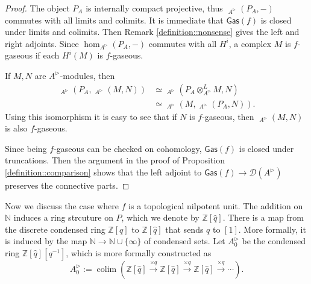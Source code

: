 \documentclass{article}
\theoremstyle{plain}
\theoremstyle{definition}
\theoremstyle{remark}
\DeclareMathOperator{\colim}{colim}
\DeclareMathOperator{\rhoms}{\underline{RHom}}
\newcommand{\dten}{\otimes ^{L}}
\newcommand{\huflag}{\triangleright}
\newcommand{\D}{\mathcal{D}}
\begin{document}
\begin{proof}
The object $ P _{A} $ is internally compact projective, thus $ \rhoms _{A ^{\huflag}}(P _{A}, -) $ commutes with all limits and colimits.
It is immediate that $ \mathsf{Gas}(f) $ is closed under limits and colimits.
Then Remark \ref{definition::nonsense} gives the left and right adjoints.
Since $ \hom _{A ^{\huflag}}(P _{A}, -) $ commutes with all $ H ^{i} $, a complex $ M $ is $ f $-gaseous if each $ H ^{i}(M) $ is $ f $-gaseous.

If $ M,N $ are $ A ^{\huflag} $-modules, then
\begin{align*}
\rhoms _{A ^{\huflag}}(P _{A}, \rhoms _{A ^{\huflag}}(M, N))
&\simeq \rhoms _{A ^{\huflag}}(P _{A}\dten _{A ^{\huflag}} M, N)\\
&\simeq \rhoms _{A ^{\huflag}}(M, \rhoms _{A ^{\huflag}}(P _{A}, N)).
\end{align*}
Using this isomorphism it is easy to see that if $ N $ is $ f $-gaseous,
then $ \rhoms _{A ^{\huflag}}(M, N) $ is also $ f $-gaseous.

Since being $ f $-gaseous can be checked on cohomology, $ \mathsf{Gas}(f) $ is closed under truncations.
Then the argument in the proof of Proposition \ref{definition::comparison} shows that
the left adjoint to $ \mathsf{Gas}(f)\to \D (A ^{\huflag}) $ preserves the connective parts.
\end{proof}

Now we discuss the case where $ f $ is a topological nilpotent unit.
The addition on $ \mathbb{N} $ induces a ring strcuture on $ P $,
which we denote by $ \mathbb{Z}[\hat{q}] $.
There is a map from the discrete condensed ring $ \mathbb{Z}[q] $ to $ \mathbb{Z}[\hat{q}] $
that sends $ q $ to $ [1] $.
More formally, it is induced by the map $ \mathbb{N}\to \mathbb{N}\cup \{\infty\} $ of condensed sets.
Let $ A _{0}^{\huflag} $ be the condensed ring $ \mathbb{Z}[\hat{q}][q ^{-1}]$,
which is more formally constructed as
\begin{equation*}
A _{0}^{\huflag} := \colim (\mathbb{Z}[\hat{q}] \xrightarrow{\times q} \mathbb{Z}[\hat{q}]\xrightarrow{\times q} \mathbb{Z}[\hat{q}]\xrightarrow{\times q} \cdots   ).
\end{equation*}

%

\printbibliography
\end{document}
